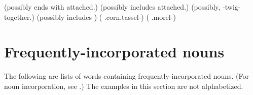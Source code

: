 \begin{multicols}{2}
 
  (possibly ends with  attached.{\stative})
  (possibly includes  attached.{\stative})
 
 
  (possibly,  \textsc{\semireflexive}-twig-together.{\stative})
  (possibly includes  \textsc{\augmentative})
  ( \textsc{\noprefix}.corn.tassel-{\nounstemformer})
 
  ( {\noprefix}.morel-{\nounstemformer})

\end{multicols}


\section{Frequently-incorporated nouns} \label{ch:frequently-incorporated nouns}
The following are lists of words containing frequently-incorporated nouns. (For noun incorporation, see .) The examples in this section are not alphabetized.

